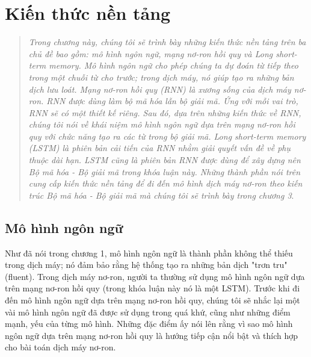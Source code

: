\chapter{Kiến thức nền tảng}
\ifpdf
    \graphicspath{{Chapter2/Chapter2Figs/PNG/}{Chapter2/Chapter2Figs/PDF/}{Chapter2/Chapter2Figs/}}
\else
    \graphicspath{{Chapter2/Chapter2Figs/EPS/}{Chapter2/Chapter2Figs/}}
\fi

\begin{quote}

\textit{Trong chương này, chúng tôi sẽ trình bày những kiến thức nền tảng trên ba chủ đề bao gồm: mô hình ngôn ngữ, mạng nơ-ron hồi quy và Long short-term memory. Mô hình ngôn ngữ cho phép chúng ta dự đoán từ tiếp theo trong một chuỗi từ cho trước; trong dịch máy, nó giúp tạo ra những bản dịch lưu loát. Mạng nơ-ron hồi quy (RNN) là xương sống của dịch máy nơ-ron. RNN được dùng làm bộ mã hóa lẫn bộ giải mã. Ứng với mỗi vai trò, RNN sẽ có một thiết kế riêng. Sau đó, dựa trên những kiến thức về RNN, chúng tôi nói về khái niệm mô hình ngôn ngữ dựa trên mạng nơ-ron hồi quy với chức năng tạo ra các từ trong bộ giải mã. Long short-term memory (LSTM) là phiên bản cải tiến của RNN nhằm giải quyết vấn đề về phụ thuộc dài hạn. LSTM cũng là phiên bản RNN được dùng để xây dựng nên Bộ mã hóa - Bộ giải mã trong khóa luận này. Những thành phần nói trên cung cấp kiến thức nền tảng để đi đến mô hình dịch máy nơ-ron theo kiến trúc Bộ mã hóa - Bộ giải mã mà chúng tôi sẽ trình bày trong chương 3}.

\end{quote}

\section{Mô hình ngôn ngữ}

Như đã nói trong chương 1, mô hình ngôn ngữ là thành phần không thể thiếu trong dịch máy; nó đảm bảo rằng hệ thống tạo ra những bản dịch "trơn tru" (fluent). Trong dịch máy nơ-ron, người ta thường sử dụng mô hình ngôn ngữ dựa trên mạng nơ-ron hồi quy (trong khóa luận này nó là một LSTM). Trước khi đi đến mô hình ngôn ngữ dựa trên mạng nơ-ron hồi quy, chúng tôi sẽ nhắc lại một vài mô hình ngôn ngữ đã được sử dụng trong quá khứ, cũng như những điểm mạnh, yếu của từng mô hình. Những đặc điểm ấy nói lên rằng vì sao mô hình ngôn ngữ dựa trên mạng nơ-ron hồi quy là hướng tiếp cận nổi bật và thích hợp cho bài toán dịch máy nơ-ron.

